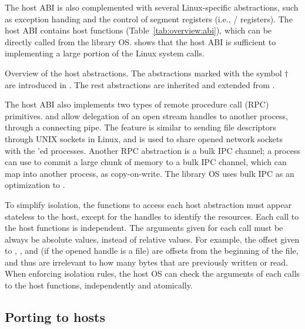 The host ABI is also complemented with several Linux-specific abstractions, such as exception handing and the control of segment registers (i.e., / registers).
The host ABI contains \palcalls{} host functions (Table~\ref{tab:overview:abi}), which can be directly called from the library OS. \graphene{} shows that the host ABI is sufficient to implementing a large portion of the Linux system calls.


\begin{table}[htp!]
\centering

\caption{Overview of the \graphene{} host abstractions. The abstractions marked with the symbol $\dagger$ are introduced in \graphene{}. The rest abstractions are inherited and extended from \drawbridge{}.}
\label{tab:overview:abi}
\end{table}


The host ABI also implements two types of remote procedure call (RPC) primitives.
 and 
allow delegation of an open stream handles to another process, through a connecting pipe. The feature is similar to sending file descriptors through UNIX sockets in Linux, and is used to share opened network sockets with the 'ed processes.
Another RPC abstraction is a bulk IPC channel; a process can use  to commit a large chunk of memory to a bulk IPC channel, which  can map into another process, as copy-on-write. The library OS uses bulk IPC as an optimization to .


To simplify isolation, the functions to access each host abstraction must appear  stateless to the host, except for the handles to identify the resources. Each call to the host functions is independent. The arguments given for each call must be always be absolute values, instead of relative values.
For example, the offset given to , , and  (if the opened handle is a file) are offsets from the beginning of the file, and thus are irrelevant to how many bytes that are previously written or read.
When enforcing isolation rules, the host OS can check the arguments of each calls to the host functions, independently and atomically.

\subsection{Porting to hosts}
\label{sec:overview:host:port}



